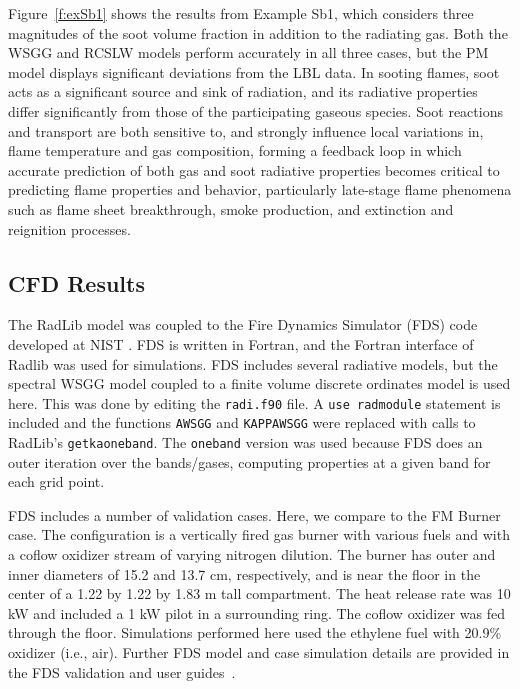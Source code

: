 \documentclass[preprint,12pt]{elsarticle}
\begin{document}
Figure~\ref{f:exSb1} shows the results from Example Sb1, which considers three magnitudes of the soot volume fraction in addition to the radiating gas. Both the WSGG and RCSLW models perform accurately in all three cases, but the PM model displays significant deviations from the LBL data. In sooting flames, soot acts as a significant source and sink of radiation, and its radiative properties differ significantly from those of the participating gaseous species. Soot reactions and transport are both sensitive to, and strongly influence local variations in, flame temperature and gas composition, forming a feedback loop in which accurate prediction of both gas and soot radiative properties becomes critical to predicting flame properties and behavior, particularly late-stage flame phenomena such as flame sheet breakthrough, smoke production, and extinction and reignition processes.



\subsection{CFD Results} \label{s:cfd}

The RadLib model was coupled to the Fire Dynamics Simulator (FDS) code developed at NIST \cite{FDS}. FDS is written in Fortran, and the Fortran interface of Radlib was used for simulations. FDS includes several radiative models, but the spectral WSGG model coupled to a finite volume discrete ordinates model is used here. This was done by editing the \texttt{radi.f90} file. A \texttt{use rad\textunderscore module} statement is included and the functions \texttt{A\textunderscore WSGG} and \texttt{KAPPA\textunderscore WSGG} were replaced with calls to RadLib's \texttt{get\textunderscore k\textunderscore a\textunderscore oneband}. The \texttt{oneband} version was used because FDS does an outer iteration over the bands/gases, computing properties at a given band for each grid point. 

FDS includes a number of validation cases. Here, we compare to the FM Burner case. The configuration is a vertically fired gas burner with various fuels and with a coflow oxidizer stream of varying nitrogen dilution. The burner has outer and inner diameters of 15.2 and 13.7 cm, respectively, and is near the floor in the center of a 1.22 by 1.22 by 1.83 m tall compartment. The heat release rate was 10 kW and included a 1 kW pilot in a surrounding ring. The coflow oxidizer was fed through the floor. Simulations performed here used the ethylene fuel with 20.9\%  oxidizer (i.e., air). Further FDS model and case simulation details are provided in the FDS validation and user guides~\cite{FDS}.
\end{document}
